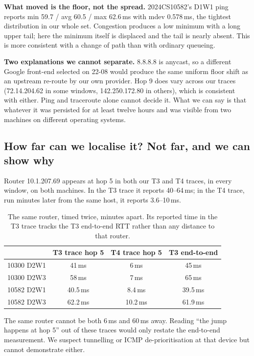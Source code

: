 \textbf{What moved is the floor, not the spread.} 2024CS10582's D1W1 ping reports min 59.7 / avg
60.5 / max 62.6\,ms with mdev 0.578\,ms, the tightest distribution in our whole set. Congestion
produces a low minimum with a long upper tail; here the minimum itself is displaced and the tail
is nearly absent. This is more consistent with a change of path than with ordinary queueing.

\textbf{Two explanations we cannot separate.} 8.8.8.8 is anycast, so a different Google front-end
selected on 22-08 would produce the same uniform floor shift as an upstream re-route by our own
provider. Hop 9 does vary across our traces (72.14.204.62 in some windows, 142.250.172.80 in
others), which is consistent with either. Ping and traceroute alone cannot decide it. What we
can say is that whatever it was persisted for at least twelve hours and was visible from two
machines on different operating systems.

\subsection{How far can we localise it? Not far, and we can show why}
\label{sec:b1hopcaveat}

Router 10.1.207.69 appears at hop 5 in both our T3 and T4 traces, in every window, on both
machines. In the T3 trace it reports 40--64\,ms; in the T4 trace, run minutes later from the same
host, it reports 3.6--10\,ms.

\begin{table}[H]
\centering
\caption{The same router, timed twice, minutes apart. Its reported time in the T3 trace tracks
the T3 end-to-end RTT rather than any distance to that router.}
\label{tab:b1hop5}
\footnotesize
\begin{tabular}{@{}lccc@{}}
\toprule
 & T3 trace hop 5 & T4 trace hop 5 & T3 end-to-end \\
\midrule
10300 D2W1 & 41\,ms & 6\,ms & 45\,ms \\
10300 D2W3 & 58\,ms & 7\,ms & 65\,ms \\
10582 D2W1 & 40.5\,ms & 8.4\,ms & 39.5\,ms \\
10582 D2W3 & 62.2\,ms & 10.2\,ms & 61.9\,ms \\
\bottomrule
\end{tabular}
\end{table}

The same router cannot be both 6\,ms and 60\,ms away. Reading ``the jump happens at hop 5'' out of
these traces would only restate the end-to-end measurement. We suspect tunnelling or ICMP
de-prioritisation at that device but cannot demonstrate either.

